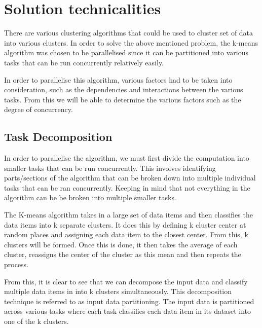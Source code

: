 \documentclass[12pt]{article}
\begin{document}
	\section{Solution technicalities}
  		\begin{flushleft}
  			There are various clustering algorithms that could be used to cluster set of data into various clusters. In order to solve the above mentioned problem, the k-means algorithm was chosen to be parallelised since it can be partitioned into various tasks that can be run concurrently relatively easily.
    	\end{flushleft}
    	
    	\begin{flushleft}
    		In order to parallelise this algorithm, various factors had to be taken into consideration, such as the dependencies and interactions between the various tasks. From this we will be able to determine the various factors such as the degree of concurrency.
    	\end{flushleft}
    	
    	\subsection{Task Decomposition}
    		\begin{flushleft}
    			In order to parallelise the algorithm, we must first divide the computation into smaller tasks that can be run concurrently. This involves identifying parts/sections of the algorithm that can be broken down into multiple individual tasks that can be ran concurrently. Keeping in mind that not everything in the algorithm can be be broken into multiple smaller tasks.
    		\end{flushleft}
    	
    		\begin{flushleft}
    			The K-means algorithm takes in a large set of data items and then classifies the data items into k separate clusters. It does this by defining k cluster center at random places and assigning each data item to the closest center. From this, k clusters will be formed. Once this is done, it then takes the average of each cluster, reassigns the center of the cluster as this mean and then repeats the process.
    		\end{flushleft}
    	
    		\begin{flushleft}
    			From this, it is clear to see that we can decompose the input data and classify multiple data items in into k clusters simultaneously. This decomposition technique is referred to as input data partitioning. The input data is partitioned across various tasks where each task classifies each data item in its dataset into one of the k clusters.
    		\end{flushleft}
    	
\end{document}
